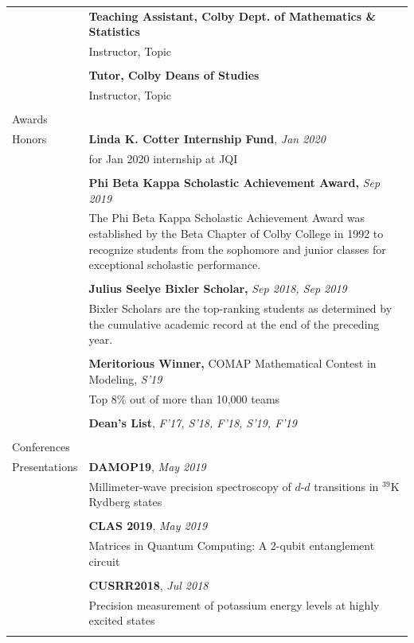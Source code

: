 \documentclass[10pt]{article}
\begin{document}
\begin{longtable}{ l m{13.5cm}   }
     					& \textbf{Teaching Assistant, Colby Dept. of Mathematics \& Statistics} \\
     					& Instructor, Topic \\
     					& \\
     					 
     					& \textbf{Tutor, Colby Deans of Studies} \\
     					& Instructor, Topic \\
     					& \\
     					 
     					 
     					 
  \large{Awards}    	& \\
  \large{Honors}		& \textbf{Linda K. Cotter Internship Fund}, \textit{Jan 2020}\\
  		 				& for Jan 2020 internship at JQI\\
  						&\\
						& \textbf{Phi Beta Kappa Scholastic Achievement Award,} \textit{Sep 2019}\\
  						& The Phi Beta Kappa Scholastic Achievement Award was established by the Beta Chapter of Colby College in 1992 to recognize students from the sophomore and junior classes for exceptional scholastic performance.\\
  						&\\
     				 	& \textbf{Julius Seelye Bixler Scholar,} \textit{Sep 2018, Sep 2019}\\
     				 	& Bixler Scholars are the top-ranking students as determined by the cumulative academic record at the end of the preceding year.\\
     				 	&\\
     				 	& \textbf{Meritorious Winner,}  COMAP Mathematical Contest in Modeling, \textit{S'19}\\
     				 	& Top 8\% out of more than 10,000 teams\\
     				 	&\\
     				 	& \textbf{Dean’s List}, \textit{F'17, S'18, F'18, S'19, F'19}\\
     				 	&\\
     				 	 
  \large{Conferences}   & \\
  \large{Presentations}	& \textbf{DAMOP19}, \textit{May 2019} \\
  						& Millimeter-wave precision spectroscopy of $d$-$d$ transitions in $^{\text{39}}$K Rydberg states\\
  						& \\
  						& \textbf{CLAS 2019}, \textit{May 2019}\\
  						& Matrices in Quantum Computing: A 2-qubit entanglement circuit\\
  						&\\
  						& \textbf{CUSRR2018}, \textit{Jul 2018}\\
  						& Precision measurement of potassium energy levels at highly excited states\\
  	 					& \\ 
 


\end{longtable}
\end{document}
